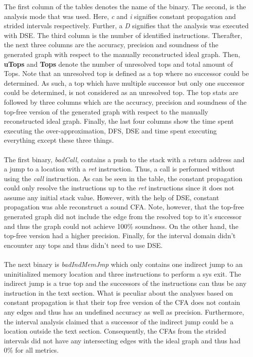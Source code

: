 \documentclass{kththesis}
\renewcommand{\it}[1]{\textit{#1}}
\begin{document}
The first column of the tables denotes the name of the binary. The second, is the analysis mode that was used. Here, \it{c} and \it{i} signifies constant propagation and strided intervals respectively. Further, a \it{D} signifies that the analysis was executed with DSE. The third column is the number of identified instructions. Therafter, the next three columns are the accuracy, precision and soundness of the generated graph with respect to the manually reconstructed ideal graph. Then, \textbf{uTops} and \textbf{Tops} denote the number of unresolved tops and total amount of Tops. Note that an unresolved top is defined as a top where no successor could be determined. As such, a top which have multiple successor but only one successor could be determined, is not considered as an unresolved top. The top stats are followed by three columns which are the accuracy, precision and soundness of the top-free version of the generated graph with respect to the manually reconstructed ideal graph. Finally, the last four columns show the time spent executing the over-approximation, DFS, DSE and time spent executing everything except these three things. 
\\ \\
The first binary, \it{badCall}, contains a push to the stack with a return address and a jump to a location with a \it{ret} instruction. Thus, a call is performed without using the \it{call} instruction. As can be seen in the table, the constant propagation could only resolve the instructions up to the \it{ret} instructions since it does not assume any initial stack value. However, with the help of DSE, constant propagation was able reconstruct a sound CFA. Note, however, that the top-free generated graph did not include the edge from the resolved top to it's successor and thus the graph could not achieve 100\% soundness. On the other hand, the top-free version had a higher precision. Finally, for the interval domain didn't encounter any tops and thus didn't need to use DSE.
\\ \\ %
The next binary is \it{badIndMemJmp} which only contains one indirect jump to an uninitialized memory location and three instructions to perform a sys exit. The indirect jump is a true top and the successors of the instructions can thus be any instruction in the text section.  What is peculiar about the analyses based on constant propagation is that their top free version of the CFA does not contain any edges and thus has an undefined accuracy as well as precision. Furthermore, the interval analysis claimed that a successor of the indirect jump could be a location outside the text section. Consequently, the CFAs from the strided intervals did not have any intersecting edges with the ideal graph and thus had 0\% for all metrics.
\end{document}
